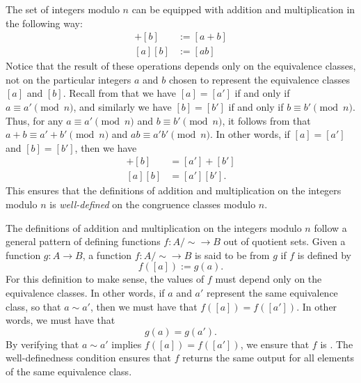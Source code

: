 The set of integers modulo $n$ can be equipped with addition and multiplication in the following way:
\begin{align*}
  [a] + [b] & := [a+b] \\
  [a][b] & := [ab]
\end{align*}
Notice that the result of these operations depends only on the equivalence classes, not on the particular integers $a$ and $b$ chosen to represent the equivalence classes $[a]$ and $[b]$. Recall from  that we have $[a]=[a']$ if and only if $a\equiv a'\pmod{n}$, and similarly we have $[b]=[b']$ if and only if $b\equiv b'\pmod{n}$. Thus, for any $a\equiv a'\pmod{n}$ and $b\equiv b'\pmod{n}$, it follows from  that $a+b\equiv a'+b'\pmod{n}$ and $ab\equiv a'b'\pmod{n}$. In other words, if $[a]=[a']$ and $[b]=[b']$, then we have
\begin{align*}
  [a]+[b] & = [a']+[b'] \\
  [a][b] & = [a'][b'].
\end{align*}
This ensures that the definitions of addition and multiplication on the integers modulo $n$ is \emph{well-defined} on the congruence classes modulo $n$.

\begin{remark}
  The definitions of addition and multiplication on the integers modulo $n$ follow a general pattern of defining functions $f:A/{\sim}\to B$ out of quotient sets. Given a function $g:A\to B$, a function $f:A/{\sim}\to B$ is said to be  from $g$ if $f$ is defined by
  \begin{equation*}
    f([a]) := g(a).
  \end{equation*}
  For this definition to make sense, the values of $f$ must depend only on the equivalence classes. In other words, if $a$ and $a'$ represent the same equivalence class, so that $a\sim a'$, then we must have that $f([a])=f([a'])$. In other words, we must have that
  \begin{equation*}
    g(a)=g(a').
  \end{equation*}
  By verifying that $a\sim a'$ implies $f([a])=f([a'])$, we ensure that $f$ is . The well-definedness condition ensures that $f$ returns the same output for all elements of the same equivalence class.
\end{remark}

